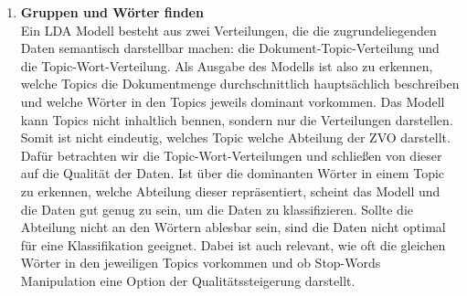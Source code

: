 \documentclass[german,version-2020-11]{uzl-thesis}
\begin{document}
\begin{itemize}
\begin{enumerate}
\item \textbf{Gruppen und Wörter finden}\\
Ein LDA Modell besteht aus zwei Verteilungen, die die zugrundeliegenden Daten semantisch darstellbar machen: die Dokument-Topic-Verteilung und die Topic-Wort-Verteilung. Als Ausgabe des Modells ist also zu erkennen, welche Topics die Dokumentmenge durchschnittlich hauptsächlich beschreiben und welche Wörter in den Topics jeweils dominant vorkommen. Das Modell kann Topics nicht inhaltlich bennen, sondern nur die Verteilungen darstellen. Somit ist nicht eindeutig, welches Topic welche Abteilung der ZVO darstellt. Dafür betrachten wir die Topic-Wort-Verteilungen und schließen von dieser auf die Qualität der Daten. Ist über die dominanten Wörter in einem Topic zu erkennen, welche Abteilung dieser repräsentiert, scheint das Modell und die Daten gut genug zu sein, um die Daten zu klassifizieren. Sollte die Abteilung nicht an den Wörtern ablesbar sein, sind die Daten nicht optimal für eine Klassifikation geeignet. Dabei ist auch relevant, wie oft die gleichen Wörter in den jeweiligen Topics vorkommen und ob Stop-Words Manipulation eine Option der Qualitätssteigerung darstellt.


\end{enumerate}
\end{itemize}
\end{document}
